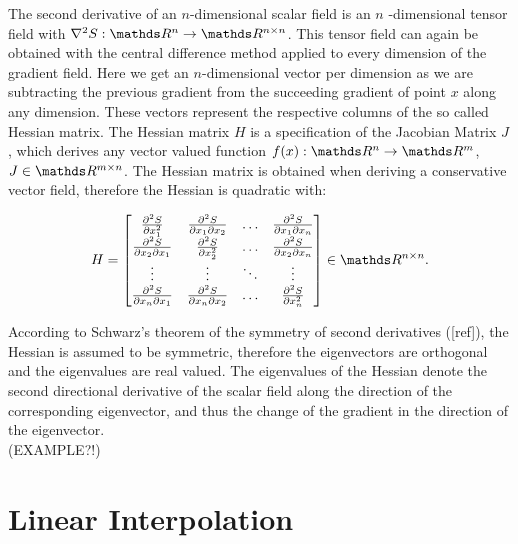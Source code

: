The second derivative of an $n$-dimensional scalar field is an $n$
-dimensional tensor field with $\nabla^2 S:\real^n \rightarrow \real^{n
\times n}$. This tensor field can again be obtained with the central
difference method applied to every dimension of the gradient field. Here
we get an $n$-dimensional vector per dimension as we are subtracting the
previous gradient from the succeeding gradient of point $x$ along any
dimension. These vectors represent the respective columns of the so
called Hessian matrix. The Hessian matrix $H$ is a specification of the
Jacobian Matrix $J$, which derives any vector valued function $f(x):
\real^n \rightarrow \real^m$, $J \in \real^{m \times n}$. The Hessian
matrix is obtained when deriving a conservative vector field, therefore
the Hessian is quadratic with:

\begin{equation}
  H =
  \begin{bmatrix}
    \frac{\partial^2 S}{\partial x_1^2} & \frac{\partial^2 S}{\partial x_1 \partial x_2} & \dots & \frac{\partial^2 S}{\partial x_1 \partial x_n}\\
    \frac{\partial^2 S}{\partial x_2 \partial x_1} & \frac{\partial^2 S}{\partial x_2^2} & \dots & \frac{\partial^2 S}{\partial x_2 \partial x_n}\\
    \vdots & \vdots & \ddots & \vdots \\
    \frac{\partial^2 S}{\partial x_n \partial x_1} & \frac{\partial^2 S}{\partial x_n \partial x_2} & \dots & \frac{\partial^2 S}{\partial x_n^2}
  \end{bmatrix}
  \in \real^{n \times n}.
\end{equation}

\noindent According to Schwarz's theorem of the symmetry of second
derivatives ([ref]), the Hessian is assumed to be symmetric, therefore
the eigenvectors are orthogonal and the eigenvalues are real valued. The
eigenvalues of the Hessian denote the second directional derivative of
the scalar field along the direction of the corresponding eigenvector,
and thus the change of the gradient in the direction of the eigenvector.
\\(EXAMPLE?!)

\section{Linear Interpolation}

